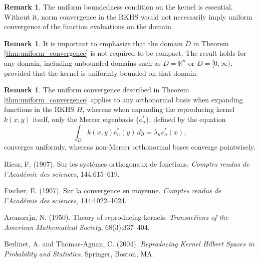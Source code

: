 \documentclass{article}
\theoremstyle{definition}
\newtheorem{remark}[theorem]{Remark}
\begin{document}
\begin{remark}
The uniform boundedness condition on the kernel is essential. Without it, norm convergence in the RKHS would not necessarily imply uniform convergence of the function evaluations on the domain.
\end{remark}

\begin{remark}
It is important to emphasize that the domain $D$ in Theorem \ref{thm:uniform_convergence} is not required to be compact. The result holds for any domain, including unbounded domains such as $D = \mathbb{R}^n$ or $D = [0, \infty)$, provided that the kernel is uniformly bounded on that domain.
\end{remark}

\begin{remark} \label{rem:mercer_uniqueness}
The uniform convergence described in Theorem \ref{thm:uniform_convergence} applies to any orthonormal basis when expanding functions in the RKHS $H$, whereas when expanding the reproducing kernel $k(x, y)$ itself, only the Mercer eigenbasis $\{e_n^*\}$, defined by the equation
\[
\int_D k(x, y)e_n^*(y)\,dy = \lambda_n e_n^*(x),
\]
converges uniformly, whereas non-Mercer orthonormal bases converge pointwisely.
\end{remark}


\begin{thebibliography}{9}

Riesz, F. (1907). Sur les syst{\`e}mes orthogonaux de fonctions. \emph{Comptes rendus de l'Acad{\'e}mie des sciences}, 144:615--619.

Fischer, E. (1907). Sur la convergence en moyenne. \emph{Comptes rendus de l'Acad{\'e}mie des sciences}, 144:1022--1024.

Aronszajn, N. (1950). Theory of reproducing kernels. \emph{Transactions of the American Mathematical Society}, 68(3):337--404.

Berlinet, A. and Thomas-Agnan, C. (2004). \emph{Reproducing Kernel Hilbert Spaces in Probability and Statistics}. Springer, Boston, MA.

\end{thebibliography}
\end{document}
